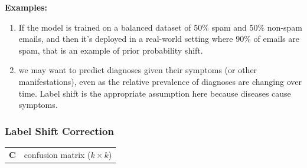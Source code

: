 \vspace{0.2cm}
\textbf{Examples:}
\begin{enumerate}
    \item If the model is trained on a balanced dataset of 50\% spam and 50\% non-spam emails, and then it’s deployed in a real-world setting where 90\% of emails are spam, that is an example of prior probability shift.

    \item we may want to predict diagnoses given their symptoms (or other manifestations), even as the relative prevalence of diagnoses are changing over time. Label shift is the appropriate assumption here because diseases cause symptoms.
\end{enumerate}

\subsubsection{Label Shift Correction \cite{dnn-1}} \label{Label Shift Correction}

\begin{customTableWrapper}{1.2}
\begin{table}[H]
    \centering
    \begin{tabular}{l l}
        $\mathbf{C}$ & confusion matrix ($k \times k$) \\
    \end{tabular}
\end{table}
\end{customTableWrapper}

